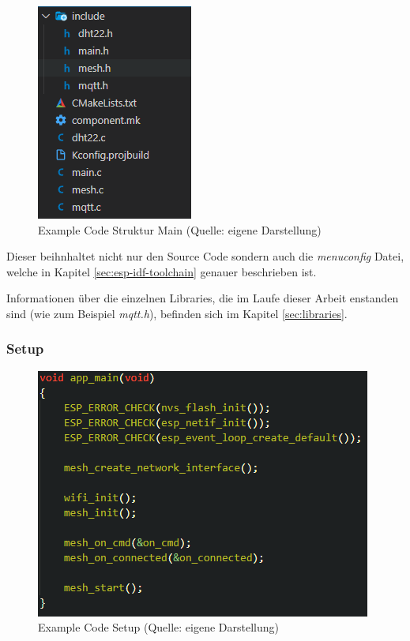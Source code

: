 \begin{figure}[H]
    \begin{center}
        \includegraphics[scale=0.8]{images/example_code_structure_main.png}
        \caption{Example Code Struktur Main (Quelle: eigene Darstellung)}
        \label{abb:example_code_structure_main}
    \end{center}
\end{figure}

Dieser beihnhaltet nicht nur den Source Code sondern auch die \textit{menuconfig} Datei, welche in Kapitel \ref{sec:esp-idf-toolchain} genauer beschrieben ist.

Informationen über die einzelnen Libraries, die im Laufe dieser Arbeit enstanden sind (wie zum Beispiel \textit{mqtt.h}), befinden sich im Kapitel \ref{sec:libraries}.

\subsubsection{Setup}

\begin{figure}[H]
    \begin{center}
        \includegraphics[scale=0.8]{images/example_code_setup.png}
        \caption{Example Code Setup (Quelle: eigene Darstellung)}
        \label{abb:example_code_setup}
    \end{center}
\end{figure}


